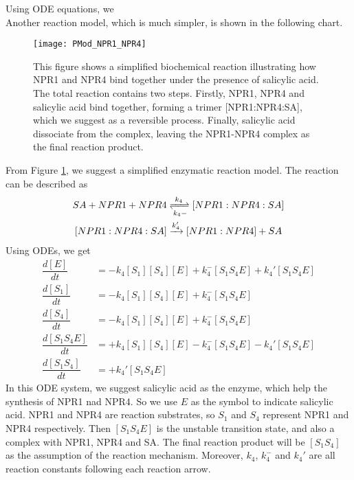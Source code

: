 Using ODE equations, we \\
Another reaction model, which is much simpler, is shown in the following chart.\\
\begin{figure}[H]
	\centering
	\texttt{[image: PMod\_NPR1\_NPR4]}
	\caption{This figure shows a simplified biochemical reaction illustrating how NPR1 and NPR4 bind together under the presence of salicylic acid. The total reaction contains two steps. Firstly, NPR1, NPR4 and salicylic acid bind together, forming a trimer [NPR1:NPR4:SA], which we suggest as a reversible process. Finally, salicylic acid dissociate from the complex, leaving the NPR1-NPR4 complex as the final reaction product.}
	\label{fig:PMod_NPR1_NPR4}
\end{figure}
From Figure \ref{fig:PMod_NPR1_NPR4}, we suggest a simplified enzymatic reaction model. The reaction can be described as\\
\begin{gather}\label{PMod_NPR1_NPR4}
SA + NPR1 + NPR4 \xrightleftharpoons[k_4-]{k_4} [NPR1:NPR4:SA]\\
[NPR1:NPR4:SA] \xrightarrow{k_4'} [NPR1:NPR4] + SA
\end{gather}
Using ODEs, we get\\
\begin{align}
\dfrac{d[E]}{dt} &= -k_4[S_1][S_4][E] + k_4^{-}[S_1 S_4 E] + k_4'[S_1 S_4 E] \label{PMod_N1_N4_ODE_1}\\
\dfrac{d[S_1]}{dt} &= -k_4[S_1][S_4][E] + k_4^{-}[S_1 S_4 E] \label{PMod_N1_N4_ODE_2}\\
\dfrac{d[S_4]}{dt} &= -k_4[S_1][S_4][E] + k_4^{-}[S_1 S_4 E] \label{PMod_N1_N4_ODE_3}\\
\dfrac{d[S_1 S_4 E]}{dt} &= +k_4[S_1][S_4][E] - k_4^{-} [S_1 S_4 E] - k_4'[S_1 S_4 E] \label{PMod_N1_N4_ODE_4}\\
\dfrac{d[S_1 S_4]}{dt} &= +k_4' [S_1 S_4 E] \label{PMod_N1_N4_ODE_5}
\end{align}
In this ODE system, we suggest salicylic acid as the enzyme, which help the synthesis of NPR1 nad NPR4. So we use $E$ as the symbol to indicate salicylic acid. NPR1 and NPR4 are reaction substrates, so $S_1$ and $S_4$ represent NPR1 and NPR4 respectively. Then $[S_1 S_4 E]$ is the unstable transition state, and also a complex with NPR1, NPR4 and SA. The final reaction product will be $[S_1 S_4]$ as the assumption of the reaction mechanism. Moreover, $k_4$, $k_4^{-}$ and $k_4'$ are all reaction constants following each reaction arrow.\\
